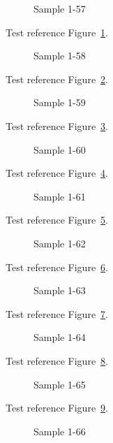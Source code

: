 \begin{figure}[tbhp]
\caption{Sample 1-57}
\label{fig:sample-1-57}
\end{figure}

Test reference Figure~\ref{fig:sample-1-57}.

\begin{figure}[tbhp]
\caption{Sample 1-58}
\label{fig:sample-1-58}
\end{figure}

Test reference Figure~\ref{fig:sample-1-58}.

\begin{figure}[tbhp]
\caption{Sample 1-59}
\label{fig:sample-1-59}
\end{figure}

Test reference Figure~\ref{fig:sample-1-59}.

\begin{figure}[tbhp]
\caption{Sample 1-60}
\label{fig:sample-1-60}
\end{figure}

Test reference Figure~\ref{fig:sample-1-60}.

\begin{figure}[tbhp]
\caption{Sample 1-61}
\label{fig:sample-1-61}
\end{figure}

Test reference Figure~\ref{fig:sample-1-61}.

\begin{figure}[tbhp]
\caption{Sample 1-62}
\label{fig:sample-1-62}
\end{figure}

Test reference Figure~\ref{fig:sample-1-62}.

\begin{figure}[tbhp]
\caption{Sample 1-63}
\label{fig:sample-1-63}
\end{figure}

Test reference Figure~\ref{fig:sample-1-63}.

\begin{figure}[tbhp]
\caption{Sample 1-64}
\label{fig:sample-1-64}
\end{figure}

Test reference Figure~\ref{fig:sample-1-64}.

\begin{figure}[tbhp]
\caption{Sample 1-65}
\label{fig:sample-1-65}
\end{figure}

Test reference Figure~\ref{fig:sample-1-65}.

\begin{figure}[tbhp]
\caption{Sample 1-66}
\label{fig:sample-1-66}
\end{figure}

